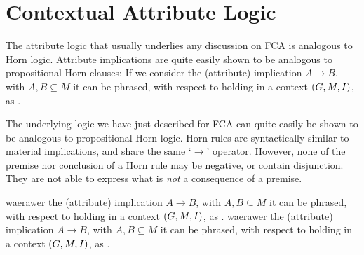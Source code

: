 \section{Contextual Attribute Logic}
\label{section:contextual-attribute-logic}

The attribute logic that usually underlies any discussion on FCA is analogous to Horn logic. Attribute implications are quite easily shown to be analogous to propositional Horn clauses: If we consider
the (attribute) implication $A \rightarrow B$, with $A, B \subseteq M$ it can be phrased, with respect to holding in a context $(G,M,\mathrel{I})$, as .

The underlying logic we have just described for FCA can quite easily be shown to be analogous to propositional Horn logic. Horn rules are syntactically similar to material implications, and share the
same `$\rightarrow$' operator. However, none of the premise nor conclusion of a Horn rule may be negative, or contain disjunction. They are not able to express what is \textit{not} a consequence of a premise.

waerawer the (attribute) implication $A \rightarrow B$, with $A, B \subseteq M$ it can be phrased, with respect to holding in a context $(G,M,\mathrel{I})$, as .
waerawer the (attribute) implication $A \rightarrow B$, with $A, B \subseteq M$ it can be phrased, with respect to holding in a context $(G,M,\mathrel{I})$, as .



